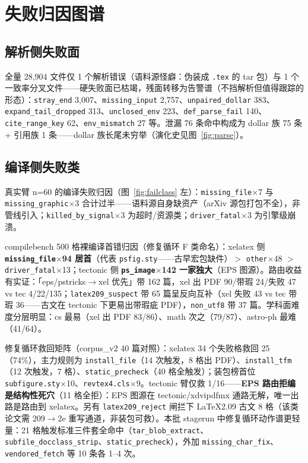 \section{失败归因图谱}
\label{sec:failures}

\subsection{解析侧失败面}

全量 28{,}904 文件仅 1 个解析错误（语料源怪癖：伪装成 \texttt{.tex} 的 tar 包）与 1 个一致率分叉文件——硬失败面已枯竭，残面转移为告警谱（不挡解析但值得跟踪的形态）：\texttt{stray\_end} 3{,}007、\texttt{missing\_input} 2{,}757、\texttt{unpaired\_dollar} 383、\texttt{expand\_tail\_dropped} 313、\texttt{unclosed\_env} 223、\texttt{def\_parse\_fail} 140、\texttt{cite\_range\_key} 62、\texttt{env\_mismatch} 27 等。泄漏 76 条命中构成为 dollar 族 75 条 + 引用族 1 条——dollar 族长尾未穷举（演化史见图~\ref{fig:parse}）。

\subsection{编译侧失败类}

真实臂 n=60 的编译失败归因（图~\ref{fig:failclass} 左）：\texttt{missing\_file}$\times$7 与 \texttt{missing\_graphic}$\times$3 合计过半——语料源自身缺资产（arXiv 源包打包不全），非管线引入；\texttt{killed\_by\_signal}$\times$3 为超时/资源类；\texttt{driver\_fatal}$\times$3 为引擎级崩溃。

compilebench 500 格裸编译首错归因（修复循环 F 类命名）：xelatex 侧 \textbf{\texttt{missing\_file}$\times$94 居首}（代表 \texttt{psfig.sty}——古早宏包缺件）$>$ \texttt{other}$\times$48 $>$ \texttt{driver\_fatal}$\times$13；tectonic 侧 \textbf{\texttt{ps\_image}$\times$142 一家独大}（EPS 图源）。路由收益有实证：「eps/pstricks$\to$xel 优先」带 162 篇，xel 出 PDF 90/带瑕 24/失败 47 vs tec 4/22/135；\texttt{latex209\_suspect} 带 65 篇呈反向互补（xel 失败 43 vs tec 带瑕 36——古文在 tectonic 下更易出带瑕疵 PDF），\texttt{non\_utf8} 带 37 篇。学科面难度分层明显：cs 最易（xel 出 PDF 83/86）、math 次之（79/87）、astro-ph 最难（41/64）。

修复循环救回矩阵（corpus\_v2 40 篇对照）：xelatex 34 个失败格救回 25（74\%），主力规则为 \texttt{install\_file}（14 次触发，8 格出 PDF）、\texttt{install\_tfm}（12 次触发，7 格）、\texttt{static\_precheck}（40 格全触发）；装包榜首位 \texttt{subfigure.sty}$\times$10、\texttt{revtex4.cls}$\times$9。tectonic 臂仅救 1/16——\textbf{EPS 路由拒编是结构性死穴}（11 格全拒）：EPS 图源在 tectonic/xdvipdfmx 通路无解，唯一出路是路由到 xelatex。另有 \texttt{latex209\_reject} 闸拦下 LaTeX2.09 古文 8 格（该类论文需 209$\to$2e 重写通道，非装包可救）。本批 stagerun 中修复循环动作谱更轻量：21 格触发标准三件套全命中（\texttt{tar\_blob\_extract}、\texttt{subfile\_docclass\_strip}、\texttt{static\_precheck}），外加 \texttt{missing\_char\_fix}、\texttt{vendored\_fetch} 等 10 条各 1--4 次。

